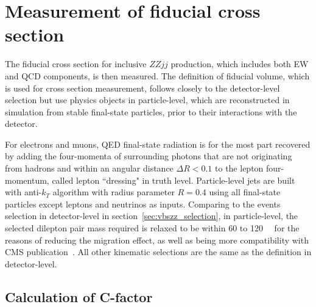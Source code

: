 \section{Measurement of fiducial cross section}
\label{sec:xsec}

The fiducial cross section for inclusive $ZZjj$ production, which includes both EW and QCD components, is then measured.
The definition of fiducial volume, which is used for cross section measurement, follows closely to the detector-level selection
but use physics objects in particle-level, which are reconstructed in simulation from stable final-state particles,
prior to their interactions with the detector.

For electrons and muons, QED final-state radiation is for the most part recovered 
by adding the four-momenta of surrounding photons that are not originating from hadrons and within an angular distance $\Delta R < 0.1$
to the lepton four-momentum, called lepton ``dressing" in truth level.
Particle-level jets are built with anti-$k_{T}$ algorithm with radius parameter $R = 0.4$ using all final-state particles except leptons and neutrinos as inputs.
Comparing to the events selection in detector-level in section~\ref{sec:vbszz_selection},
in particle-level, the selected dilepton pair mass required is relaxed to be within 60 to 120~\gev~ for the reasons of reducing the migration effect,
as well as being more compatibility with CMS publication~\cite{2017682}.
All other kinematic selections are the same as the definition in detector-level.

\subsection{Calculation of C-factor}
\label{sec:cf}

